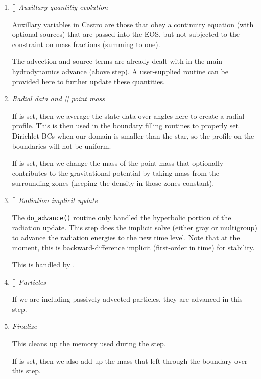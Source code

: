 \begin{enumerate}
\item {[]} {\em Auxillary quantitiy evolution} 

  Auxillary variables in Castro are those that obey a continuity
  equation (with optional sources) that are passed into the EOS, but
  not subjected to the constraint on mass fractions (summing to one).

  The advection and source terms are already dealt with in the 
  main hydrodynamics advance (above step).  A user-supplied routine
   can be provided here to further update these
  quantities.
  
\item {\em Radial data and {\rm[]} point mass} 

  If  is set, then we average the state data
  over angles here to create a radial profile.  This is then used in the 
  boundary filling routines to properly set Dirichlet BCs when our domain
  is smaller than the star, so the profile on the boundaries will not 
  be uniform.

  If  is set, then we
  change the mass of the point mass that optionally contributes to the
  gravitational potential by taking mass from the surrounding zones
  (keeping the density in those zones constant).

\item {[]} {\em Radiation implicit update} 

  The {\tt do\_advance()} routine only handled the hyperbolic
  portion of the radiation update.  This step does the implicit solve
  (either gray or multigroup) to advance the radiation energies to the 
  new time level.  Note that at the moment, this is backward-difference
  implicit (first-order in time) for stability.

  This is handled by .

\item {[]} {\em Particles} 

  If we are including passively-advected particles, they are
  advanced in this step.

\item {\em Finalize}

  This cleans up the memory used during the step.  

  If  is set, then we also add up
  the mass that left through the boundary over this step. 

\end{enumerate}

